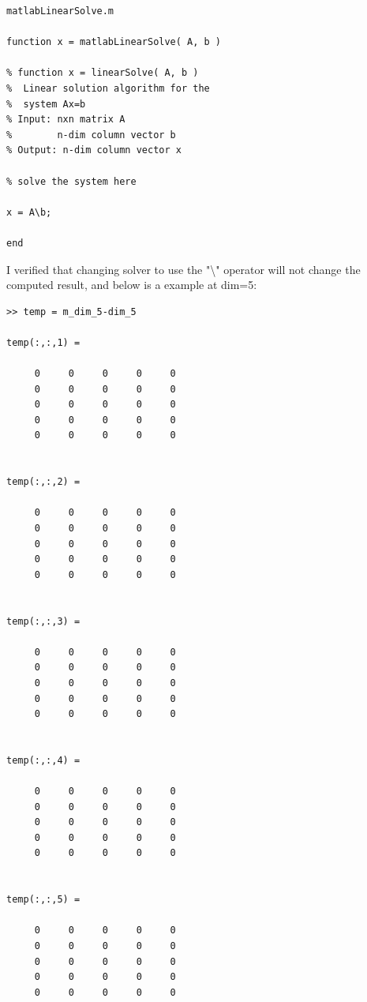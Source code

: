 \documentclass[11pt]{article}
\begin{document}
\begin{verbatim}
matlabLinearSolve.m

function x = matlabLinearSolve( A, b )

% function x = linearSolve( A, b )
%  Linear solution algorithm for the
%  system Ax=b 
% Input: nxn matrix A
%        n-dim column vector b
% Output: n-dim column vector x

% solve the system here

x = A\b;

end
\end{verbatim}
I verified that changing solver to use the "\textbackslash" operator will not change the computed result, and below is a example at dim=5:
\begin{verbatim}
>> temp = m_dim_5-dim_5

temp(:,:,1) =

     0     0     0     0     0
     0     0     0     0     0
     0     0     0     0     0
     0     0     0     0     0
     0     0     0     0     0


temp(:,:,2) =

     0     0     0     0     0
     0     0     0     0     0
     0     0     0     0     0
     0     0     0     0     0
     0     0     0     0     0


temp(:,:,3) =

     0     0     0     0     0
     0     0     0     0     0
     0     0     0     0     0
     0     0     0     0     0
     0     0     0     0     0


temp(:,:,4) =

     0     0     0     0     0
     0     0     0     0     0
     0     0     0     0     0
     0     0     0     0     0
     0     0     0     0     0


temp(:,:,5) =

     0     0     0     0     0
     0     0     0     0     0
     0     0     0     0     0
     0     0     0     0     0
     0     0     0     0     0
\end{verbatim}
\end{document}

